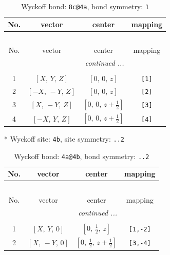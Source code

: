 \documentclass[fleqn,8pt]{jsarticle}
\begin{document}
\renewcommand{\arraystretch}{1.2}
\begin{longtable}{cccc}
\caption{Wyckoff bond: {\tt 8c@4a}, bond symmetry: {\tt 1}}
 \\
 \hline \hline
No. & vector & center & mapping \\ \hline \endfirsthead

\multicolumn{3}{l}{\tablename\ \thetable{}} \\
 \hline \hline
No. & vector & center & mapping \\ \hline \endhead

 \hline \hline
\multicolumn{3}{r}{\footnotesize\it continued ...} \\ \endfoot

 \hline \hline
\multicolumn{3}{r}{} \\ \endlastfoot

1 & $\left[ X,\, Y,\, Z \right]$ & $\left[ 0,\, 0,\, z \right]$ & {\tt [1]} \\ \hline
2 & $\left[ - X,\, - Y,\, Z \right]$ & $\left[ 0,\, 0,\, z \right]$ & {\tt [2]} \\ \hline
3 & $\left[ X,\, - Y,\, Z \right]$ & $\left[ 0,\, 0,\, z + \frac{1}{2} \right]$ & {\tt [3]} \\ \hline
4 & $\left[ - X,\, Y,\, Z \right]$ & $\left[ 0,\, 0,\, z + \frac{1}{2} \right]$ & {\tt [4]} \\
\end{longtable}
* Wyckoff site: {\tt 4b}, site symmetry: {\tt ..2}
\renewcommand{\arraystretch}{1.2}
\begin{longtable}{cccc}
\caption{Wyckoff bond: {\tt 4a@4b}, bond symmetry: {\tt ..2}}
 \\
 \hline \hline
No. & vector & center & mapping \\ \hline \endfirsthead

\multicolumn{3}{l}{\tablename\ \thetable{}} \\
 \hline \hline
No. & vector & center & mapping \\ \hline \endhead

 \hline \hline
\multicolumn{3}{r}{\footnotesize\it continued ...} \\ \endfoot

 \hline \hline
\multicolumn{3}{r}{} \\ \endlastfoot

1 & $\left[ X,\, Y,\, 0 \right]$ & $\left[ 0,\, \frac{1}{2},\, z \right]$ & {\tt [1,-2]} \\ \hline
2 & $\left[ X,\, - Y,\, 0 \right]$ & $\left[ 0,\, \frac{1}{2},\, z + \frac{1}{2} \right]$ & {\tt [3,-4]} \\
\end{longtable}
\end{document}
